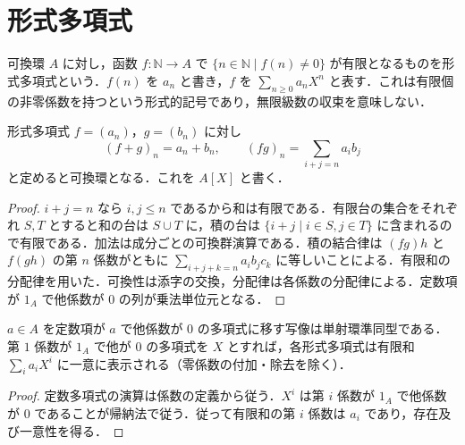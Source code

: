 \section{形式多項式}
\begin{defn}[形式多項式]
可換環 $A$ に対し，函数 $f:\mathbb N\to A$ で $\{n\in\mathbb N\mid f(n)\ne0\}$ が有限となるものを形式多項式という．$f(n)$ を $a_n$ と書き，$f$ を $\sum_{n\geq0}a_nX^n$ と表す．これは有限個の非零係数を持つという形式的記号であり，無限級数の収束を意味しない．
\end{defn}
\begin{prop}[多項式環]
形式多項式 $f=(a_n)$，$g=(b_n)$ に対し
\[
 (f+g)_n=a_n+b_n,\qquad
 (fg)_n=\sum_{i+j=n}a_ib_j
\]
と定めると可換環となる．これを $A[X]$ と書く．
\end{prop}
\begin{proof}
$i+j=n$ なら $i,j\leq n$ であるから和は有限である．有限台の集合をそれぞれ $S,T$ とすると和の台は $S\cup T$ に，積の台は $\{i+j\mid i\in S,j\in T\}$ に含まれるので有限である．加法は成分ごとの可換群演算である．積の結合律は $(fg)h$ と $f(gh)$ の第 $n$ 係数がともに $\sum_{i+j+k=n}a_ib_jc_k$ に等しいことによる．有限和の分配律を用いた．可換性は添字の交換，分配律は各係数の分配律による．定数項が $1_A$ で他係数が $0$ の列が乗法単位元となる．
\end{proof}
\begin{prop}[多項式の一意表示]
$a\in A$ を定数項が $a$ で他係数が $0$ の多項式に移す写像は単射環準同型である．第 $1$ 係数が $1_A$ で他が $0$ の多項式を $X$ とすれば，各形式多項式は有限和 $\sum_i a_iX^i$ に一意に表示される（零係数の付加・除去を除く）．
\end{prop}
\begin{proof}
定数多項式の演算は係数の定義から従う．$X^i$ は第 $i$ 係数が $1_A$ で他係数が $0$ であることが帰納法で従う．従って有限和の第 $i$ 係数は $a_i$ であり，存在及び一意性を得る．
\end{proof}
